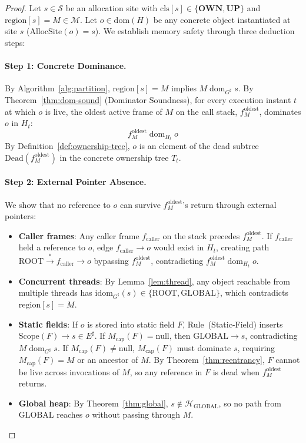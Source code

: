 \documentclass[12pt,a4paper]{article}
\newcommand{\OWN}{\textbf{OWN}}
\newcommand{\UP}{\textbf{UP}}
\newcommand{\GLOBAL}{\text{GLOBAL}}
\newcommand{\ROOT}{\text{ROOT}}
\newcommand{\idom}{\text{idom}}
\newcommand{\dom}{\mathrel{\text{dom}}}
\newcommand{\Scope}{\text{Scope}}
\newcommand{\cls}{\text{cls}}
\newcommand{\region}{\text{region}}
\begin{document}
\begin{proof}
Let $s \in \mathcal{S}$ be an allocation site with $\cls[s] \in \{\OWN, \UP\}$ and $\region[s] = M \in \mathcal{M}$. Let $o \in \text{dom}(H)$ be any concrete object instantiated at site $s$ ($\text{AllocSite}(o) = s$). We establish memory safety through three deduction steps:

\paragraph{Step 1: Concrete Dominance.} By Algorithm~\ref{alg:partition}, $\region[s] = M$ implies $M \dom_{G^\sharp} s$. By Theorem~\ref{thm:dom-sound} (Dominator Soundness), for every execution instant $t$ at which $o$ is live, the oldest active frame of $M$ on the call stack, $f_M^{\text{oldest}}$, dominates $o$ in $H_t$:
\[
f_M^{\text{oldest}} \dom_{H_t} o
\]
By Definition~\ref{def:ownership-tree}, $o$ is an element of the dead subtree $\text{Dead}(f_M^{\text{oldest}})$ in the concrete ownership tree $T_t$.

\paragraph{Step 2: External Pointer Absence.} We show that no reference to $o$ can survive $f_M^{\text{oldest}}$'s return through external pointers:
\begin{itemize}[leftmargin=*]
  \item \textbf{Caller frames}: Any caller frame $f_{\text{caller}}$ on the stack precedes $f_M^{\text{oldest}}$. If $f_{\text{caller}}$ held a reference to $o$, edge $f_{\text{caller}} \to o$ would exist in $H_t$, creating path $\ROOT \xrightarrow{*} f_{\text{caller}} \to o$ bypassing $f_M^{\text{oldest}}$, contradicting $f_M^{\text{oldest}} \dom_{H_t} o$.
  \item \textbf{Concurrent threads}: By Lemma~\ref{lem:thread}, any object reachable from multiple threads has $\idom_{G^\sharp}(s) \in \{\ROOT, \GLOBAL\}$, which contradicts $\region[s] = M$.
  \item \textbf{Static fields}: If $o$ is stored into static field $F$, Rule~(Static-Field) inserts $\Scope(F) \to s \in E^\sharp$. If $M_{\text{cap}}(F) = \text{null}$, then $\GLOBAL \to s$, contradicting $M \dom_{G^\sharp} s$. If $M_{\text{cap}}(F) \neq \text{null}$, $M_{\text{cap}}(F)$ must dominate $s$, requiring $M_{\text{cap}}(F) = M$ or an ancestor of $M$. By Theorem~\ref{thm:reentrancy}, $F$ cannot be live across invocations of $M$, so any reference in $F$ is dead when $f_M^{\text{oldest}}$ returns.
  \item \textbf{Global heap}: By Theorem~\ref{thm:global}, $s \notin \mathcal{H}_{\GLOBAL}$, so no path from $\GLOBAL$ reaches $o$ without passing through $M$.
\end{itemize}


\end{proof}
\end{document}
